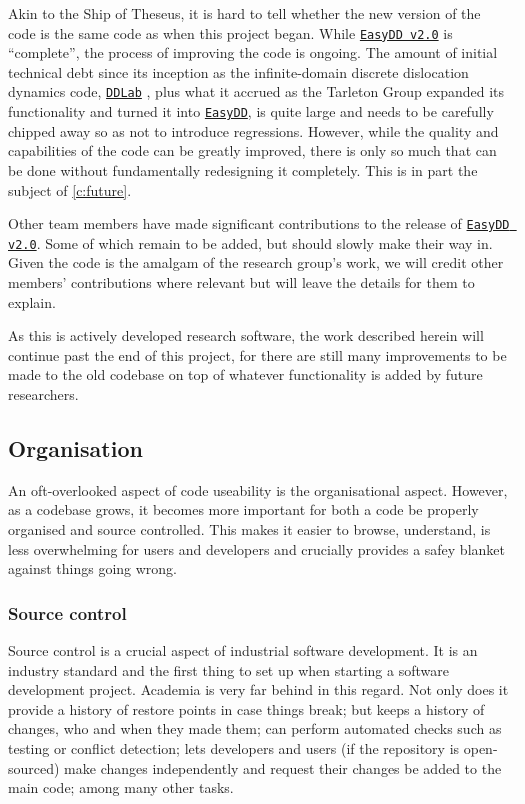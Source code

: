 Akin to the Ship of Theseus, it is hard to tell whether the new version of the code is the same code as when this project began. While \href{https://github.com/TarletonGroup/EasyDD}{\texttt{EasyDD v2.0}} is ``complete'', the process of improving the code is ongoing. The amount of initial technical debt since its inception as the infinite-domain discrete dislocation dynamics code, \href{http://micro.stanford.edu/wiki/Main_Page}{\texttt{DDLab}} \cite{ddlab}, plus what it accrued as the Tarleton Group expanded its functionality and turned it into \href{https://github.com/TarletonGroup/EasyDD/tree/65907b022d1fe408fc1b2e5c5ca2bd1797ccae04}{\texttt{EasyDD}}, is quite large and needs to be carefully chipped away so as not to introduce regressions. However, while the quality and capabilities of the code can be greatly improved, there is only so much that can be done without fundamentally redesigning it completely. This is in part the subject of \cref{c:future}.

Other team members have made significant contributions to the release of \href{https://github.com/TarletonGroup/EasyDD}{\texttt{EasyDD v2.0}}. Some of which remain to be added, but should slowly make their way in. Given the code is the amalgam of the research group's work, we will credit other members' contributions where relevant but will leave the details for them to explain.

As this is actively developed research software, the work described herein will continue past the end of this project, for there are still many improvements to be made to the old codebase on top of whatever functionality is added by future researchers.

\subsection{Organisation}

An oft-overlooked aspect of code useability is the organisational aspect. However, as a codebase grows, it becomes more important for both a code be properly organised and source controlled. This makes it easier to browse, understand, is less overwhelming for users and developers and crucially provides a safey blanket against things going wrong.

\subsubsection{Source control}

Source control is a crucial aspect of industrial software development. It is an industry standard and the first thing to set up when starting a software development project. Academia is very far behind in this regard. Not only does it provide a history of restore points in case things break; but keeps a history of changes, who and when they made them; can perform automated checks such as testing or conflict detection; lets developers and users (if the repository is open-sourced) make changes independently and request their changes be added to the main code; among many other tasks.

